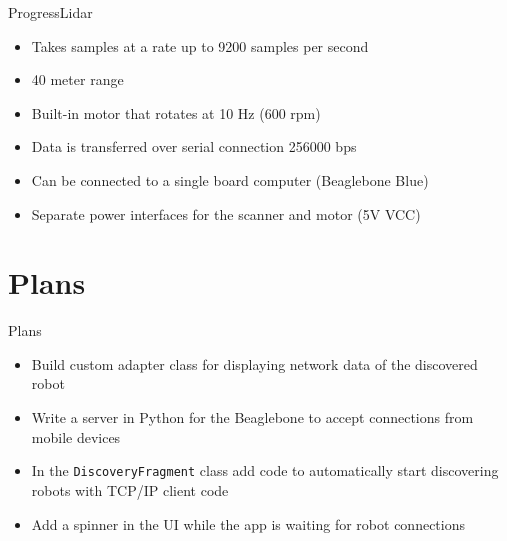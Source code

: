 \documentclass{beamer}
\begin{document}
\begin{frame}{Progress}{Lidar}
    \begin{itemize}
        \item Takes samples at a rate up to 9200 samples per second
        \item 40 meter range
        \item Built-in motor that rotates at 10 Hz (600 rpm)
        \item Data is transferred over serial connection 256000 bps
        \item Can be connected to a single board computer (Beaglebone Blue)
        \item Separate power interfaces for the scanner and motor (5V VCC)
    \end{itemize}
\end{frame}

\section{Plans}
\begin{frame}{Plans}{}
    \begin{itemize}
        \item Build custom adapter class for displaying network data of the discovered robot
        \item Write a server in Python for the Beaglebone to accept connections from mobile devices
        \item In the \texttt{DiscoveryFragment} class add code to automatically start discovering robots with TCP/IP client code
        \item Add a spinner in the UI while the app is waiting for robot connections
    \end{itemize}
\end{frame}
\end{document}
